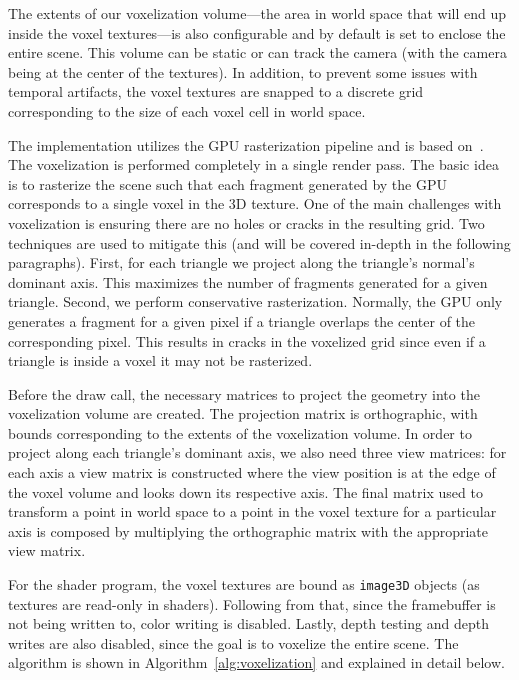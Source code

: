 The extents of our voxelization volume---the area in world space that will end up inside the voxel textures---is also configurable and by default is set to enclose the entire scene. This volume can be static or can track the camera (with the camera being at the center of the textures). In addition, to prevent some issues with temporal artifacts, the voxel textures are snapped to a discrete grid corresponding to the size of each voxel cell in world space.

The implementation utilizes the GPU rasterization pipeline and is based on~\cite{crassin2012octree}. The voxelization is performed completely in a single render pass. The basic idea is to rasterize the scene such that each fragment generated by the GPU corresponds to a single voxel in the 3D texture.
One of the main challenges with voxelization is ensuring there are no holes or cracks in the resulting grid. Two techniques are used to mitigate this (and will be covered in-depth in the following paragraphs). First, for each triangle we project along the triangle's normal's dominant axis. This maximizes the number of fragments generated for a given triangle. Second, we perform conservative rasterization. Normally, the GPU only generates a fragment for a given pixel if a triangle overlaps the center of the corresponding pixel. This results in cracks in the voxelized grid since even if a triangle is inside a voxel it may not be rasterized.

Before the draw call, the necessary matrices to project the geometry into the voxelization volume are created. The projection matrix is orthographic, with bounds corresponding to the extents of the voxelization volume. In order to project along each triangle's dominant axis, we also need three view matrices: for each axis a view matrix is constructed where the view position is at the edge of the voxel volume and looks down its respective axis. The final matrix used to transform a point in world space to a point in the voxel texture for a particular axis is composed by multiplying the orthographic matrix with the appropriate view matrix.

For the shader program, the voxel textures are bound as \texttt{image3D} objects (as textures are read-only in shaders). Following from that, since the framebuffer is not being written to, color writing is disabled. Lastly, depth testing and depth writes are also disabled, since the goal is to voxelize the entire scene. The algorithm is shown in Algorithm~\ref{alg:voxelization} and explained in detail below.

